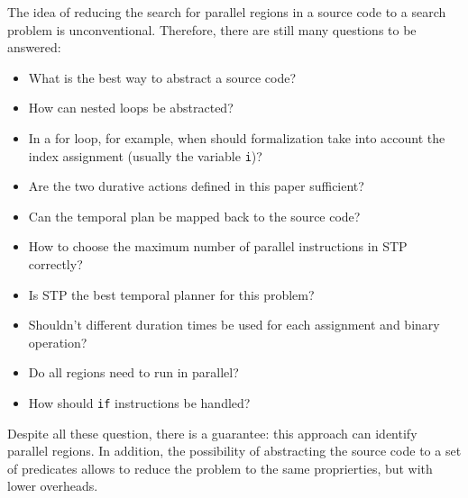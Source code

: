 \documentclass[letterpaper]{article}
\begin{document}
The idea of reducing the search for parallel regions in a source code to a search problem is unconventional. Therefore, there are still many questions to be answered:

\begin{itemize}
    \item What is the best way to abstract a source code?
    \item How can nested loops be abstracted?
    \item In a for loop, for example, when should formalization take into account the index assignment (usually the variable \texttt{i})?
    \item Are the two durative actions defined in this paper sufficient?
    \item Can the temporal plan be mapped back to the source code?
    \item How to choose the maximum number of parallel instructions in STP correctly?
    \item Is STP the best temporal planner for this problem?
    \item Shouldn't different duration times be used for each assignment and binary operation?
    \item Do all regions need to run in parallel?
    \item How should \texttt{if} instructions be handled?
\end{itemize}

Despite all these question, there is a guarantee: this approach can identify parallel regions. In addition, the possibility of abstracting the source code to a set of predicates allows to reduce the problem to the same proprierties, but with lower overheads.




\end{document}
